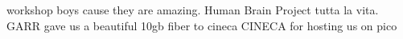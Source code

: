\documentclass[12pt]{spieman}  %
\begin{document}
		



\acknowledgments
workshop boys cause they are amazing.
Human Brain Project tutta la vita. 
GARR gave us a beautiful 10gb fiber to cineca
CINECA for hosting us on pico

\end{document}
